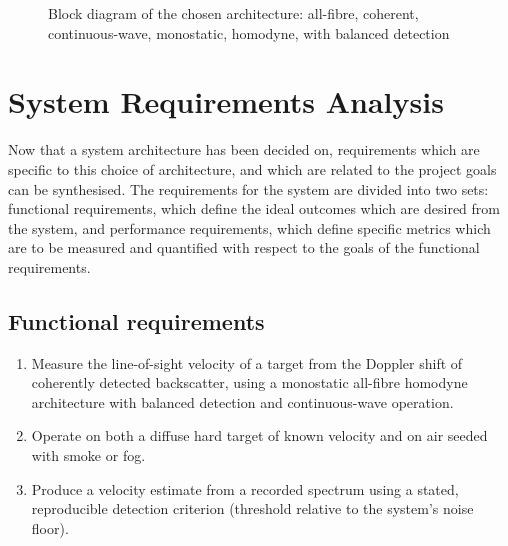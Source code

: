 \begin{figure}[H]
{}
\caption{Block diagram of the chosen architecture: all-fibre, coherent,
continuous-wave, monostatic, homodyne, with balanced detection}
\label{fig:design-architecture}
\end{figure}

\section{System Requirements Analysis}
\label{sec:design-sysReqs}
Now that a system architecture has been decided on, requirements which are specific to this choice of architecture, and which are related to the project goals can be synthesised. The requirements for the system are divided into two sets: functional requirements, which define the ideal outcomes which are desired from the system, and performance requirements, which define specific metrics which are to be measured and quantified with respect to the goals of the functional requirements. 

\subsection{Functional requirements}
\begin{enumerate}

  \item Measure the line-of-sight velocity of a target from the          Doppler shift of coherently detected backscatter,
        using a monostatic all-fibre homodyne architecture with balanced detection and continuous-wave operation.
  \item Operate on both a diffuse hard target of known velocity and on air seeded with smoke or fog. 
  \item Produce a velocity estimate from a recorded spectrum using a stated, reproducible detection criterion (threshold relative to the system's noise floor).
\end{enumerate}

